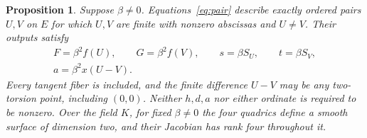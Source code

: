 \documentclass[11pt,a4paper]{article}
\newtheorem{proposition}[theorem]{Proposition}
\begin{document}
\begin{proposition}\label{prop:pair}
Suppose $\beta\ne0$. Equations~\eqref{eq:pair} describe exactly
ordered pairs $U,V$ on $E$ for which $U,V$ are finite with nonzero
abscissas and $U\ne V$. Their outputs satisfy
\[
 \begin{gathered}
 F=\beta^2f(U),\qquad G=\beta^2f(V),\qquad
 s=\beta S_U,\qquad t=\beta S_V,\\
                      a=\beta^2x(U-V).
 \end{gathered}
\]
Every tangent fiber is included, and the finite difference $U-V$ may
be any two-torsion point, including $(0,0)$. Neither $h,d,a$ nor either
ordinate is required to be nonzero. Over the field $K$, for fixed
$\beta\ne0$ the four quadrics define a smooth surface of dimension
two, and their Jacobian has rank four throughout it.
\end{proposition}
\end{document}
